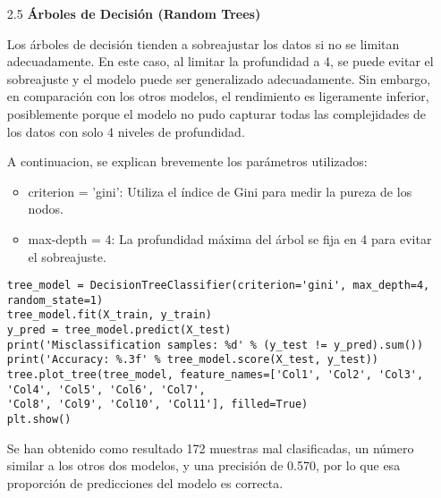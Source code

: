 \documentclass{article}
\begin{document}
\bigskip

\begin{itemize}

\item[2.5]  {\bf \'Arboles de Decisi\'on (Random Trees)}

Los \'arboles de decisi\'on tienden a sobreajustar los datos si no se limitan adecuadamente. En este caso, al limitar la profundidad a 4, se puede evitar el sobreajuste y el modelo puede ser generalizado adecuadamente. Sin embargo, en comparaci\'on con los otros modelos, el rendimiento es ligeramente inferior, posiblemente porque el modelo no pudo capturar todas las complejidades de los datos con solo 4 niveles de profundidad.

A continuacion, se explican brevemente los par\'ametros utilizados:

\begin{itemize}

\item
criterion = 'gini': Utiliza el índice de Gini para medir la pureza de los nodos.

\item
max-depth = 4: La profundidad m\'axima del \'arbol se fija en 4 para evitar el sobreajuste.

\end{itemize}

\begin{tcolorbox}[width=14cm]
\begin{scriptsize}
\begin{verbatim}
tree_model = DecisionTreeClassifier(criterion='gini', max_depth=4, random_state=1)
tree_model.fit(X_train, y_train)
y_pred = tree_model.predict(X_test)
print('Misclassification samples: %d' % (y_test != y_pred).sum())
print('Accuracy: %.3f' % tree_model.score(X_test, y_test))
tree.plot_tree(tree_model, feature_names=['Col1', 'Col2', 'Col3', 'Col4', 'Col5', 'Col6', 'Col7', 
'Col8', 'Col9', 'Col10', 'Col11'], filled=True)
plt.show()
\end{verbatim}
\end{scriptsize}
\end{tcolorbox}

Se han obtenido como resultado 172 muestras mal clasificadas, un n\'umero similar a los otros dos modelos, y una precisi\'on de 0.570, por lo que esa proporci\'on de predicciones del modelo es correcta.

\end{itemize}

\end{document}
